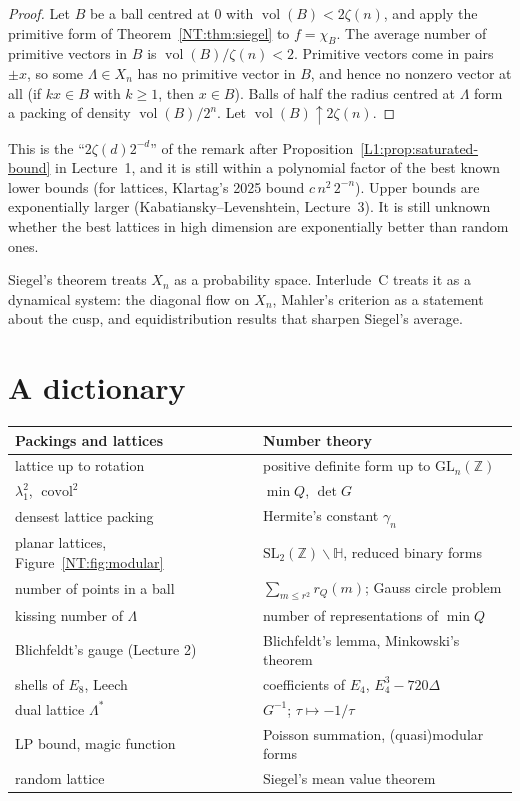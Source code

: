 \documentclass[11pt,openany]{book}
\theoremstyle{plain}
\theoremstyle{definition}
\theoremstyle{remark}
\newcommand{\Z}{\mathbb{Z}}
\newcommand{\Lat}{\Lambda}             %
\newcommand{\vol}{\operatorname{vol}}
\newcommand{\covol}{\operatorname{covol}}
\newcommand{\GL}{\mathrm{GL}}
\newcommand{\SL}{\mathrm{SL}}
\begin{document}
\begin{proof}
Let $B$ be a ball centred at $0$ with $\vol(B)<2\zeta(n)$, and apply the primitive form of
Theorem~\ref{NT:thm:siegel} to $f=\chi_B$. The average number of primitive vectors in $B$ is
$\vol(B)/\zeta(n)<2$. Primitive vectors come in pairs $\pm x$, so some $\Lat\in X_n$ has no primitive
vector in $B$, and hence no nonzero vector at all (if $kx\in B$ with $k\ge1$, then $x\in B$). Balls of
half the radius centred at $\Lat$ form a packing of density $\vol(B)/2^n$. Let
$\vol(B)\uparrow2\zeta(n)$.
\end{proof}

This is the ``$2\zeta(d)2^{-d}$'' of the remark after Proposition~\ref{L1:prop:saturated-bound} in
Lecture~1, and it is still within a polynomial factor of the best known lower bounds (for lattices,
Klartag's 2025 bound $c\,n^2\,2^{-n}$). Upper bounds are exponentially larger
(Kabatiansky--Levenshtein, Lecture~3). It is still unknown whether the best lattices in high dimension are
exponentially better than random ones.

Siegel's theorem treats $X_n$ as a probability space. Interlude~C treats it as a dynamical system: the
diagonal flow on $X_n$, Mahler's criterion as a statement about the cusp, and equidistribution results
that sharpen Siegel's average.

\section{A dictionary}
\label{NT:sec:dictionary}

\begin{center}
\renewcommand{\arraystretch}{1.25}
\begin{tabular}{p{}p{}}
\toprule
Packings and lattices & Number theory\\
\midrule
lattice up to rotation & positive definite form up to $\GL_n(\Z)$\\
$\lambda_1^2$, $\covol^2$ & $\min Q$, $\det G$\\
densest lattice packing & Hermite's constant $\gamma_n$\\
planar lattices, Figure~\ref{NT:fig:modular} & $\SL_2(\Z)\backslash\mathbb H$, reduced binary forms\\
number of points in a ball & $\sum_{m\le r^2}r_Q(m)$; Gauss circle problem\\
kissing number of $\Lat$ & number of representations of $\min Q$\\
Blichfeldt's gauge (Lecture 2) & Blichfeldt's lemma, Minkowski's theorem\\
shells of $E_8$, Leech & coefficients of $E_4$, $E_4^3-720\Delta$\\
dual lattice $\Lat^*$ & $G^{-1}$; $\tau\mapsto-1/\tau$\\
LP bound, magic function & Poisson summation, (quasi)modular forms\\
random lattice & Siegel's mean value theorem\\
\bottomrule
\end{tabular}
\end{center}
\end{document}
